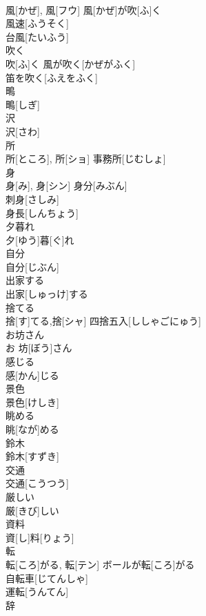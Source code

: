 \documentclass[8pt]{extreport}
\begin{document}
\begin{CJK}{UTF8}{min}
\\	風[かぜ], 風[フウ]	風[かぜ]が吹[ふ]く 
\\	風速[ふうそく] 
\\	台風[たいふう] 
\\	吹く	
\\	吹[ふ]く	風が吹く[かぜがふく]
\\	笛を吹く[ふえをふく] 
\\	鴫	
\\	鴫[しぎ]	
\\	沢	
\\	沢[さわ]	
\\	所	
\\	所[ところ], 所[ショ]	事務所[じむしょ] 
\\	身	
\\	身[み], 身[シン]	身分[みぶん] 
\\	刺身[さしみ] 
\\	身長[しんちょう] 
\\	夕暮れ	
\\	夕[ゆう]暮[ぐ]れ	
\\	自分	
\\	自分[じぶん]	
\\	出家する	
\\	出家[しゅっけ]する	
\\	捨てる	
\\	捨[す]てる,捨[シャ]	四捨五入[ししゃごにゅう] 
\\	お坊さん	
\\	お 坊[ぼう]さん	
\\	感じる	
\\	感[かん]じる	
\\	景色	
\\	景色[けしき]	
\\	眺める	
\\	眺[なが]める	
\\	鈴木	
\\	鈴木[すずき]	
\\	交通	
\\	交通[こうつう]	
\\	厳しい	
\\	厳[きび]しい	
\\	資料	
\\	資[し]料[りょう]	
\\	転	
\\	転[ころ]がる, 転[テン]	ボールが転[ころ]がる 
\\	自転車[じてんしゃ] 
\\	運転[うんてん] 
\\	辞	

\end{CJK}
\end{document}
